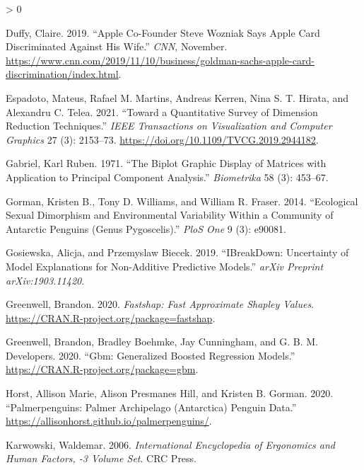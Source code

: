 \documentclass[
]{article}
\newlength{\cslhangindent}
\newenvironment{CSLReferences}[2] %
 {%
  \setlength{\parindent}{0pt}
  \ifodd #1 \everypar{\setlength{\hangindent}{\cslhangindent}}\ignorespaces\fi
  \ifnum #2 > 0
  \setlength{\parskip}{#2\baselineskip}
  \fi
 }%
 {}
\begin{document}
\begin{CSLReferences}{1}{0}
\leavevmode\hypertarget{ref-duffy_apple_2019}{}%
Duffy, Claire. 2019. {``Apple Co-Founder {Steve} {Wozniak} Says {Apple}
{Card} Discriminated Against His Wife.''} \emph{CNN}, November.
\url{https://www.cnn.com/2019/11/10/business/goldman-sachs-apple-card-discrimination/index.html}.

\leavevmode\hypertarget{ref-espadoto_toward_2021}{}%
Espadoto, Mateus, Rafael M. Martins, Andreas Kerren, Nina S. T. Hirata,
and Alexandru C. Telea. 2021. {``Toward a {Quantitative} {Survey} of
{Dimension} {Reduction} {Techniques}.''} \emph{IEEE Transactions on
Visualization and Computer Graphics} 27 (3): 2153--73.
\url{https://doi.org/10.1109/TVCG.2019.2944182}.

\leavevmode\hypertarget{ref-gabriel_biplot_1971}{}%
Gabriel, Karl Ruben. 1971. {``The Biplot Graphic Display of Matrices
with Application to Principal Component Analysis.''} \emph{Biometrika}
58 (3): 453--67.

\leavevmode\hypertarget{ref-gorman_ecological_2014}{}%
Gorman, Kristen B., Tony D. Williams, and William R. Fraser. 2014.
{``Ecological Sexual Dimorphism and Environmental Variability Within a
Community of {Antarctic} Penguins (Genus {Pygoscelis}).''} \emph{PloS
One} 9 (3): e90081.

\leavevmode\hypertarget{ref-gosiewska_ibreakdown_2019}{}%
Gosiewska, Alicja, and Przemyslaw Biecek. 2019. {``{IBreakDown}:
{Uncertainty} of Model Explanations for Non-Additive Predictive
Models.''} \emph{arXiv Preprint arXiv:1903.11420}.

\leavevmode\hypertarget{ref-greenwell_fastshap_2020}{}%
Greenwell, Brandon. 2020. \emph{Fastshap: {Fast} {Approximate} {Shapley}
{Values}}. \url{https://CRAN.R-project.org/package=fastshap}.

\leavevmode\hypertarget{ref-greenwell_gbm_2020}{}%
Greenwell, Brandon, Bradley Boehmke, Jay Cunningham, and G. B. M.
Developers. 2020. {``Gbm: {Generalized} {Boosted} {Regression}
{Models}.''} \url{https://CRAN.R-project.org/package=gbm}.

\leavevmode\hypertarget{ref-horst_palmerpenguins_2020}{}%
Horst, Allison Marie, Alison Presmanes Hill, and Kristen B. Gorman.
2020. {``Palmerpenguins: {Palmer} {Archipelago} ({Antarctica}) Penguin
Data.''} \url{https://allisonhorst.github.io/palmerpenguins/}.

\leavevmode\hypertarget{ref-karwowski_international_2006}{}%
Karwowski, Waldemar. 2006. \emph{International {Encyclopedia} of
{Ergonomics} and {Human} {Factors}, -3 {Volume} {Set}}. CRC Press.


\end{CSLReferences}
\end{document}

